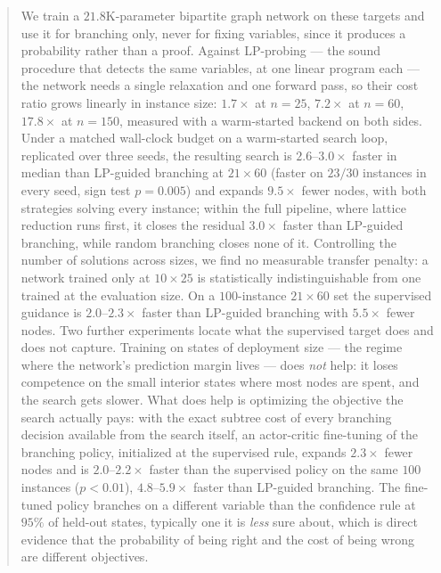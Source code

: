 \documentclass[preprint,12pt]{elsarticle}
\begin{document}
\begin{frontmatter}
\begin{abstract}
We train a $21.8$K-parameter bipartite graph network on these targets and use it for branching only, never for fixing variables, since it produces a probability rather than a proof. Against LP-probing --- the sound procedure that detects the same variables, at one linear program each --- the network needs a single relaxation and one forward pass, so their cost ratio grows linearly in instance size: $1.7\times$ at $n=25$, $7.2\times$ at $n=60$, $17.8\times$ at $n=150$, measured with a warm-started backend on both sides. Under a matched wall-clock budget on a warm-started search loop, replicated over three seeds, the resulting search is $2.6$--$3.0\times$ faster in median than LP-guided branching at $21\times60$ (faster on $23/30$ instances in every seed, sign test $p=0.005$) and expands $9.5\times$ fewer nodes, with both strategies solving every instance; within the full pipeline, where lattice reduction runs first, it closes the residual $3.0\times$ faster than LP-guided branching, while random branching closes none of it. Controlling the number of solutions across sizes, we find no measurable transfer penalty: a network trained only at $10\times25$ is statistically indistinguishable from one trained at the evaluation size. On a $100$-instance $21\times60$ set the supervised guidance is $2.0$--$2.3\times$ faster than LP-guided branching with $5.5\times$ fewer nodes. Two further experiments locate what the supervised target does and does not capture. Training on states of deployment size --- the regime where the network's prediction margin lives --- does \emph{not} help: it loses competence on the small interior states where most nodes are spent, and the search gets slower. What does help is optimizing the objective the search actually pays: with the exact subtree cost of every branching decision available from the search itself, an actor-critic fine-tuning of the branching policy, initialized at the supervised rule, expands $2.3\times$ fewer nodes and is $2.0$--$2.2\times$ faster than the supervised policy on the same $100$ instances ($p<0.01$), $4.8$--$5.9\times$ faster than LP-guided branching. The fine-tuned policy branches on a different variable than the confidence rule at $95\%$ of held-out states, typically one it is \emph{less} sure about, which is direct evidence that the probability of being right and the cost of being wrong are different objectives.


\end{abstract}
\end{frontmatter}
\end{document}
